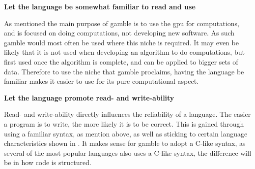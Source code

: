 \textbf{Let the language be somewhat familiar to read and use}

As mentioned the main purpose of \gls{gamble} is to use the \acrshort{gpu} for computations, and is focused on doing computations, not developing new software.
As such \gls{gamble} would most often be used where this niche is required.
It may even be likely that it is not used when developing an algorithm to do computations, but first used once the algorithm is complete, and can be applied to bigger sets of data.
Therefore to use the niche that \gls{gamble} proclaims, having the language be familiar makes it easier to use for its pure computational aspect.

\textbf{Let the language promote read- and write-ability}

Read- and write-ability directly influences the reliability of a language. 
The easier a program is to write, the more likely it is to be correct. \citep{Sebesta}
This is gained through using a familiar syntax, as mention above, as well as sticking to certain language characteristics shown in .
It makes sense for \gls{gamble} to adopt a C-like syntax, as several of the most popular languages also uses a C-like syntax, the difference will be in how code is structured. \citep{TIOBE}
